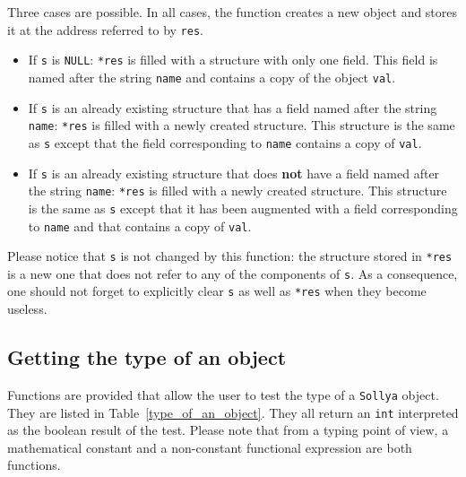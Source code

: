 \documentclass[a4paper]{article}
\newcommand{\sollya}{\texttt{Sollya}\xspace}
\begin{document}
Three cases are possible. In all cases, the function creates a new object and stores it at the address referred to by \texttt{res}.
\begin{itemize}
\item  If \texttt{s} is \texttt{NULL}: \texttt{*res} is filled with a structure with only one field. This field is named after the string \texttt{name} and contains a copy of the object \texttt{val}.
\item If \texttt{s} is an already existing structure that has a field named after the string \texttt{name}: \texttt{*res} is filled with a newly created structure. This structure is the same as \texttt{s} except that the field corresponding to \texttt{name} contains a copy of \texttt{val}.
\item If \texttt{s} is an already existing structure that does \textbf{not} have a field named after the string \texttt{name}: \texttt{*res} is filled with a newly created structure. This structure is the same as \texttt{s} except that it has been augmented with a field corresponding to \texttt{name} and that contains a copy of \texttt{val}.
\end{itemize}
Please notice that \texttt{s} is not changed by this function: the structure stored in \texttt{*res} is a new one that does not refer to any of the components of \texttt{s}. As a consequence, one should not forget to explicitly clear \texttt{s} as well as \texttt{*res} when they become useless.

\subsection{Getting the type of an object}
Functions are provided that allow the user to test the type of a \sollya object. They are listed in Table~\ref{type_of_an_object}. They all return an \verb|int| interpreted as the boolean result of the test. Please note that from a typing point of view, a mathematical constant and a non-constant functional expression are both functions.
\end{document}
